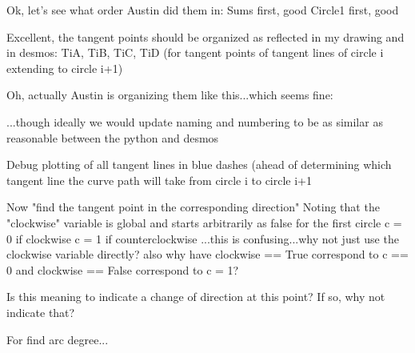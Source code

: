 \documentclass[sigconf]{acmart}
\begin{document}
    Ok, let's see what order Austin did them in:
    Sums first, good
    Circle1 first, good

    Excellent, the tangent points should be organized as reflected in my drawing and in desmos:
    TiA, TiB, TiC, TiD (for tangent points of tangent lines of circle i extending to circle i+1)

    Oh, actually Austin is organizing them like this...which seems fine:
    
    ...though ideally we would update naming and numbering to be as similar as reasonable between the python and desmos

    Debug plotting of all tangent lines in blue dashes (ahead of determining which tangent line the curve path will take from circle i to circle i+1

    Now "find the tangent point in the corresponding direction"
    Noting that the "clockwise" variable is global and starts arbitrarily as false for the first circle
    c = 0 if clockwise
    c = 1 if counterclockwise
    ...this is confusing...why not just use the clockwise variable directly?
    also why have clockwise == True correspond to c == 0 and clockwise == False correspond to c = 1?

    Is this meaning to indicate a change of direction at this point? If so, why not indicate that?

    For find arc degree...
    
    
    
\end{document}
